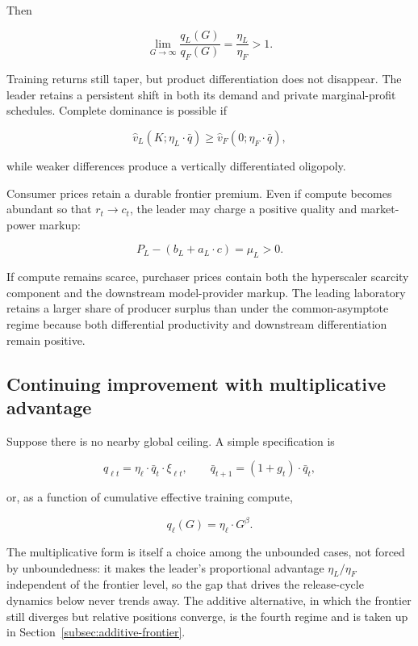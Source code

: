 \documentclass[11pt]{article}
\begin{document}
Then

\begin{equation}\lim_{G\rightarrow\infty}\frac{q_L(G)}{q_F(G)}=\frac{\eta_L}{\eta_F}>1.\end{equation}

Training returns still taper, but product differentiation does not disappear. The leader retains a persistent shift in both its demand and private marginal-profit schedules. Complete dominance is possible if

\begin{equation}\widehat v_L(K;\eta_L\cdot\bar q)\geq\widehat v_F(0;\eta_F\cdot\bar q),\end{equation}

while weaker differences produce a vertically differentiated oligopoly.

Consumer prices retain a durable frontier premium. Even if compute becomes abundant so that $r_t\rightarrow c_t$, the leader may charge a positive quality and market-power markup:

\begin{equation}P_L-\left(b_L+a_L\cdot c\right)=\mu_L>0.\end{equation}

If compute remains scarce, purchaser prices contain both the hyperscaler scarcity component and the downstream model-provider markup. The leading laboratory retains a larger share of producer surplus than under the common-asymptote regime because both differential productivity and downstream differentiation remain positive.

\subsection{Continuing improvement with multiplicative advantage}
\label{subsec:continuing-improvement}

Suppose there is no nearby global ceiling. A simple specification is

\begin{equation}q_{\ell t}=\eta_\ell\cdot\bar q_t\cdot\xi_{\ell t},\qquad \bar q_{t+1}=\left(1+g_t\right)\cdot\bar q_t,\end{equation}

or, as a function of cumulative effective training compute,

\begin{equation}q_\ell(G)=\eta_\ell\cdot G^\beta.\end{equation}

The multiplicative form is itself a choice among the unbounded cases, not forced by unboundedness: it makes the leader's proportional advantage $\eta_L/\eta_F$ independent of the frontier level, so the gap that drives the release-cycle dynamics below never trends away. The additive alternative, in which the frontier still diverges but relative positions converge, is the fourth regime and is taken up in Section~\ref{subsec:additive-frontier}.
\end{document}
